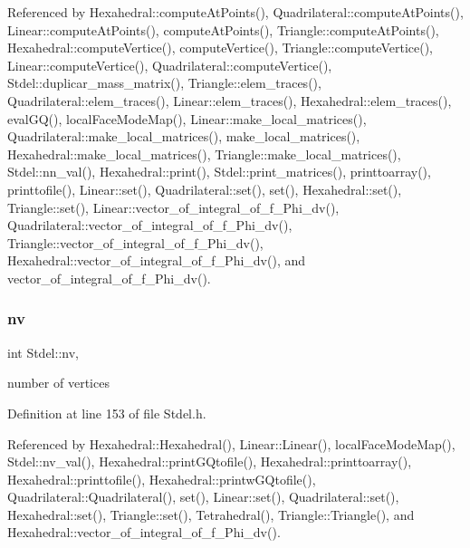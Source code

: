 Referenced by Hexahedral\+::compute\+At\+Points(), Quadrilateral\+::compute\+At\+Points(), Linear\+::compute\+At\+Points(), compute\+At\+Points(), Triangle\+::compute\+At\+Points(), Hexahedral\+::compute\+Vertice(), compute\+Vertice(), Triangle\+::compute\+Vertice(), Linear\+::compute\+Vertice(), Quadrilateral\+::compute\+Vertice(), Stdel\+::duplicar\+\_\+mass\+\_\+matrix(), Triangle\+::elem\+\_\+traces(), Quadrilateral\+::elem\+\_\+traces(), Linear\+::elem\+\_\+traces(), Hexahedral\+::elem\+\_\+traces(), eval\+G\+Q(), local\+Face\+Mode\+Map(), Linear\+::make\+\_\+local\+\_\+matrices(), Quadrilateral\+::make\+\_\+local\+\_\+matrices(), make\+\_\+local\+\_\+matrices(), Hexahedral\+::make\+\_\+local\+\_\+matrices(), Triangle\+::make\+\_\+local\+\_\+matrices(), Stdel\+::nn\+\_\+val(), Hexahedral\+::print(), Stdel\+::print\+\_\+matrices(), printtoarray(), printtofile(), Linear\+::set(), Quadrilateral\+::set(), set(), Hexahedral\+::set(), Triangle\+::set(), Linear\+::vector\+\_\+of\+\_\+integral\+\_\+of\+\_\+f\+\_\+\+Phi\+\_\+dv(), Quadrilateral\+::vector\+\_\+of\+\_\+integral\+\_\+of\+\_\+f\+\_\+\+Phi\+\_\+dv(), Triangle\+::vector\+\_\+of\+\_\+integral\+\_\+of\+\_\+f\+\_\+\+Phi\+\_\+dv(), Hexahedral\+::vector\+\_\+of\+\_\+integral\+\_\+of\+\_\+f\+\_\+\+Phi\+\_\+dv(), and vector\+\_\+of\+\_\+integral\+\_\+of\+\_\+f\+\_\+\+Phi\+\_\+dv().

\mbox{\label{classStdel_a20c0e35541cab4a1f07974659ae7a9ad}} 
\subsubsection{\texorpdfstring{nv}{nv}}
{\footnotesize\ttfamily int Stdel\+::nv\hspace{0.3cm}{\ttfamily [protected]}, {\ttfamily [inherited]}}



number of vertices 



Definition at line 153 of file Stdel.\+h.



Referenced by Hexahedral\+::\+Hexahedral(), Linear\+::\+Linear(), local\+Face\+Mode\+Map(), Stdel\+::nv\+\_\+val(), Hexahedral\+::print\+G\+Qtofile(), Hexahedral\+::printtoarray(), Hexahedral\+::printtofile(), Hexahedral\+::printw\+G\+Qtofile(), Quadrilateral\+::\+Quadrilateral(), set(), Linear\+::set(), Quadrilateral\+::set(), Hexahedral\+::set(), Triangle\+::set(), Tetrahedral(), Triangle\+::\+Triangle(), and Hexahedral\+::vector\+\_\+of\+\_\+integral\+\_\+of\+\_\+f\+\_\+\+Phi\+\_\+dv().


